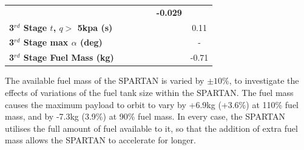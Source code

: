 \begin{table}
\begin{tabular}{l c c c c c c}
	& \textbf{\thirddExergyEffmFuelNinetyFiveNoReturn}
	& \textbf{\thirddExergyEffmFuelStandardNoReturn}
	& \textbf{\thirddExergyEffmFuelOneHundredFiveNoReturn}
	& \textbf{\thirddExergyEffmFuelOneHundredTenNoReturn}
	& \textbf{-0.029}
	\\
	\textbf{3$^{rd}$ Stage $t$, $q >$ 5kpa (s)}
	& \thirdqOverFivemFuelNinetyNoReturn
	& \thirdqOverFivemFuelNinetyFiveNoReturn
	& \thirdqOverFivemFuelStandardNoReturn
	& \thirdqOverFivemFuelOneHundredFiveNoReturn
	& \thirdqOverFivemFuelOneHundredTenNoReturn
	&0.11
	\\
	\textbf{3$^{rd}$ Stage max $\alpha$ (deg)}
	& \thirdmaxAoAmFuelNinetyNoReturn
	& \thirdmaxAoAmFuelNinetyFiveNoReturn
	& \thirdmaxAoAmFuelStandardNoReturn
	& \thirdmaxAoAmFuelOneHundredFiveNoReturn
	& \thirdmaxAoAmFuelOneHundredTenNoReturn
	& -
	\\
	\textbf{3$^{rd}$ Stage Fuel Mass (kg)}
	& \thirdmFuelmFuelNinetyNoReturn
	& \thirdmFuelmFuelNinetyFiveNoReturn
	& \thirdmFuelmFuelStandardNoReturn
	& \thirdmFuelmFuelOneHundredFiveNoReturn
	& \thirdmFuelmFuelOneHundredTenNoReturn
	&-0.71
	\\
	\hline 
\end{tabular} 
\end{table}

The available fuel mass of the SPARTAN is varied by $\pm 10\%$, to investigate the effects of variations of the fuel tank size within the SPARTAN.
The fuel mass causes the maximum payload to orbit to vary by +6.9kg (+3.6\%) at 110\% fuel mass, and by -7.3kg (3.9\%) at 90\% fuel mass. 
 In every case, the SPARTAN utilises the full amount of fuel available to it, so that the addition of extra fuel mass allows the SPARTAN to accelerate for longer. 

